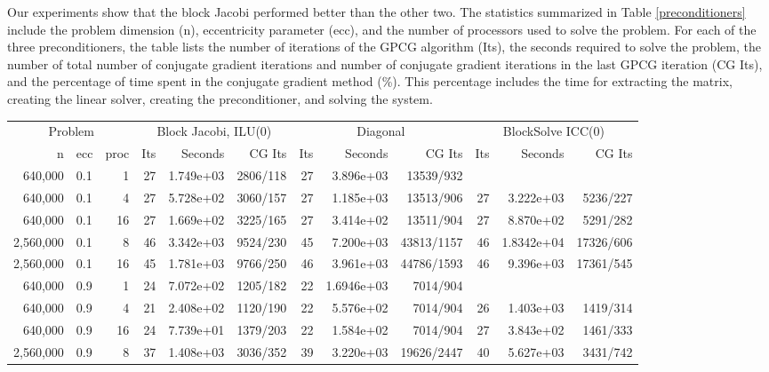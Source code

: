 Our experiments show that the block Jacobi
performed better than the other two.
The statistics summarized in Table \ref{preconditioners}
include the problem dimension (n), eccentricity parameter (ecc),
and the number of processors used to solve the problem.  For
each of the three preconditioners, the table lists the number
of iterations of the GPCG algorithm (Its), the seconds  required
to solve the problem, the number of total number of conjugate
gradient iterations
and number of conjugate gradient iterations in the last
GPCG iteration (CG Its),
and the percentage of time spent in the conjugate gradient method (\%).
This percentage includes the time for extracting the matrix, creating
the linear solver, creating the preconditioner, and solving the system.

\begin{table}[htbp]
\begin{center} \begin{tiny}
\begin{tabular}{|rlr|rrr|rrr|rrr|}
\hline
\multicolumn{3}{|c|}{Problem}&
\multicolumn{3}{c|}{Block Jacobi, ILU(0)}&
\multicolumn{3}{c|}{Diagonal}&
\multicolumn{3}{c|}{BlockSolve ICC(0)}\\
 n & ecc & proc &
Its & Seconds & CG Its &
Its & Seconds & CG Its &
Its & Seconds & CG Its \\
\hline
640,000 & 0.1 & 1 & 27 & 1.749e+03 & 2806/118 & 27 & 3.896e+03 & 13539/932 &  &&  \\
640,000 & 0.1 & 4 & 27 & 5.728e+02 & 3060/157 & 27 & 1.185e+03 & 13513/906 & 27 & 3.222e+03 & 5236/227  \\
640,000 & 0.1 & 16 & 27 & 1.669e+02 & 3225/165 & 27 & 3.414e+02 & 13511/904 & 27 & 8.870e+02 & 5291/282 \\
2,560,000 & 0.1 & 8 & 46 & 3.342e+03 & 9524/230 & 45 & 7.200e+03 & 43813/1157 & 46 & 1.8342e+04 & 17326/606 \\
2,560,000 & 0.1 & 16 & 45 & 1.781e+03 & 9766/250 & 46 & 3.961e+03 & 44786/1593 & 46 & 9.396e+03 & 17361/545 \\
\hline
640,000 & 0.9 & 1 & 24 & 7.072e+02 & 1205/182 & 22 &  1.6946e+03 & 7014/904&  &  & \\
640,000 & 0.9 & 4 & 21 & 2.408e+02 & 1120/190 & 22 & 5.576e+02 & 7014/904  & 26 & 1.403e+03 & 1419/314  \\
640,000 & 0.9 & 16 & 24 & 7.739e+01 & 1379/203 & 22 & 1.584e+02 & 7014/904 & 27 & 3.843e+02 & 1461/333  \\
2,560,000 & 0.9 & 8 & 37 & 1.408e+03 & 3036/352 & 39 & 3.220e+03 & 19626/2447 & 40 & 5.627e+03 & 3431/742 \\

\end{tabular}
\end{tiny}
\end{center}
\end{table}
